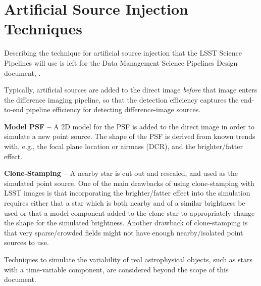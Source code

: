 \section{Artificial Source Injection Techniques}\label{sec:tech}

Describing the technique for artificial source injection that the LSST Science Pipelines will use is left for the Data Management Science Pipelines Design document, .

Typically, artificial sources are added to the direct image {\it before} that image enters the difference imaging pipeline, so that the detection efficiency captures the end-to-end pipeline efficiency for detecting difference-image sources.

{\bf Model PSF --}
A 2D model for the PSF is added to the direct image in order to simulate a new point source.
The shape of the PSF is derived from known trends with, e.g., the focal plane location or airmass (DCR), and the brighter/fatter effect.

{\bf Clone-Stamping --}
A nearby star is cut out and rescaled, and used as the simulated point source.
One of the main drawbacks of using clone-stamping with LSST images is that incorporating the brighter/fatter effect into the simulation requires either that a star which is both nearby and of a similar brightness be used or that a model component added to the clone star to appropriately change the shape for the simulated brightness.
Another drawback of clone-stamping is that very sparse/crowded fields might not have enough nearby/isolated point sources to use.

Techniques to simulate the variability of real astrophysical objects, such as stars with a time-variable component, are considered beyond the scope of this document.

